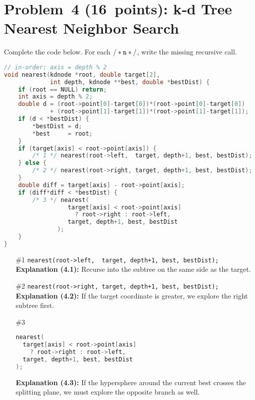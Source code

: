\documentclass[12pt]{article}
\begin{document}
\section*{Problem 4 (16 points): k‑d Tree Nearest Neighbor Search}
Complete the code below. For each \(\tt /* n */\), write the missing recursive call.
\begin{lstlisting}[language=C]
// in-order: axis = depth % 2
void nearest(kdnode *root, double target[2],
             int depth, kdnode **best, double *bestDist) {
    if (root == NULL) return;
    int axis = depth % 2;
    double d = (root->point[0]-target[0])*(root->point[0]-target[0])
             + (root->point[1]-target[1])*(root->point[1]-target[1]);
    if (d < *bestDist) {
        *bestDist = d;
        *best     = root;
    }
    if (target[axis] < root->point[axis]) {
        /* 1 */ nearest(root->left,  target, depth+1, best, bestDist);
    } else {
        /* 2 */ nearest(root->right, target, depth+1, best, bestDist);
    }
    double diff = target[axis] - root->point[axis];
    if (diff*diff < *bestDist) {
        /* 3 */ nearest(
                  target[axis] < root->point[axis]
                    ? root->right : root->left,
                  target, depth+1, best, bestDist
               );
    }
}
\end{lstlisting}
\begin{itemize}
  \item[\#1] \verb|nearest(root->left,  target, depth+1, best, bestDist);|  
    \\ \textbf{Explanation (4.1):} Recurse into the subtree on the same side as the target.
  \item[\#2] \verb|nearest(root->right, target, depth+1, best, bestDist);|  
    \\ \textbf{Explanation (4.2):} If the target coordinate is greater, we explore the right subtree first.
  \item[\#3] 
\begin{lstlisting}[language=C]
nearest(
  target[axis] < root->point[axis]
    ? root->right : root->left,
  target, depth+1, best, bestDist
);
\end{lstlisting}
    
    \textbf{Explanation (4.3):} If the hypersphere around the current best crosses the splitting plane, we must explore the opposite branch as well.
\end{itemize}

\newpage
\end{document}
